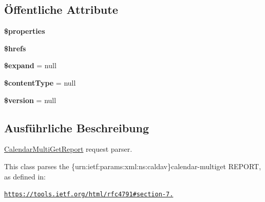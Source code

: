 \subsection*{Öffentliche Attribute}
\begin{DoxyCompactItemize}
\item 
\mbox{\label{class_sabre_1_1_cal_d_a_v_1_1_xml_1_1_request_1_1_calendar_multi_get_report_acefbc4c5c95af957e6f414bfb2e97817}} 
{\bfseries \$properties}
\item 
\mbox{\label{class_sabre_1_1_cal_d_a_v_1_1_xml_1_1_request_1_1_calendar_multi_get_report_a6df868590023ec99431cacf39a99fb2f}} 
{\bfseries \$hrefs}
\item 
\mbox{\label{class_sabre_1_1_cal_d_a_v_1_1_xml_1_1_request_1_1_calendar_multi_get_report_ae482bb7308df917b1de5a23344d10125}} 
{\bfseries \$expand} = null
\item 
\mbox{\label{class_sabre_1_1_cal_d_a_v_1_1_xml_1_1_request_1_1_calendar_multi_get_report_a2972c0ce5984802bcbd0ccefc9d8e49f}} 
{\bfseries \$content\+Type} = null
\item 
\mbox{\label{class_sabre_1_1_cal_d_a_v_1_1_xml_1_1_request_1_1_calendar_multi_get_report_a639d46f328e039ea34c89d2f7bc2cc57}} 
{\bfseries \$version} = null
\end{DoxyCompactItemize}


\subsection{Ausführliche Beschreibung}
\mbox{\hyperlink{class_sabre_1_1_cal_d_a_v_1_1_xml_1_1_request_1_1_calendar_multi_get_report}{Calendar\+Multi\+Get\+Report}} request parser.

This class parses the \{urn\+:ietf\+:params\+:xml\+:ns\+:caldav\}calendar-\/multiget R\+E\+P\+O\+RT, as defined in\+:

\href{https://tools.ietf.org/html/rfc4791#section-7.9}{\tt https\+://tools.\+ietf.\+org/html/rfc4791\#section-\/7.}

